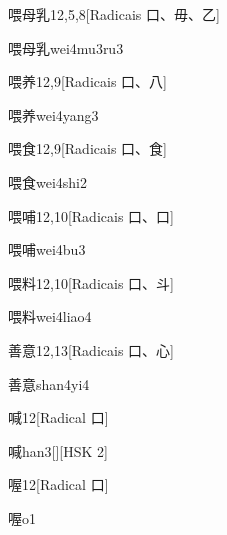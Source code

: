 \begin{entry}{喂母乳}{12,5,8}[Radicais ⼝、⽏、⼄]
  \begin{phonetics}{喂母乳}{wei4mu3ru3}
  \end{phonetics}
\end{entry}

\begin{entry}{喂养}{12,9}[Radicais ⼝、⼋]
  \begin{phonetics}{喂养}{wei4yang3}
  \end{phonetics}
\end{entry}

\begin{entry}{喂食}{12,9}[Radicais ⼝、⾷]
  \begin{phonetics}{喂食}{wei4shi2}
  \end{phonetics}
\end{entry}

\begin{entry}{喂哺}{12,10}[Radicais ⼝、⼝]
  \begin{phonetics}{喂哺}{wei4bu3}
  \end{phonetics}
\end{entry}

\begin{entry}{喂料}{12,10}[Radicais ⼝、⽃]
  \begin{phonetics}{喂料}{wei4liao4}
  \end{phonetics}
\end{entry}

\begin{entry}{善意}{12,13}[Radicais ⼝、⼼]
  \begin{phonetics}{善意}{shan4yi4}
  \end{phonetics}
\end{entry}

\begin{entry}{喊}{12}[Radical ⼝]
  \begin{phonetics}{喊}{han3}[][HSK 2]
  \end{phonetics}
\end{entry}

\begin{entry}{喔}{12}[Radical ⼝]
  \begin{phonetics}{喔}{o1}
  \end{phonetics}
\end{entry}

